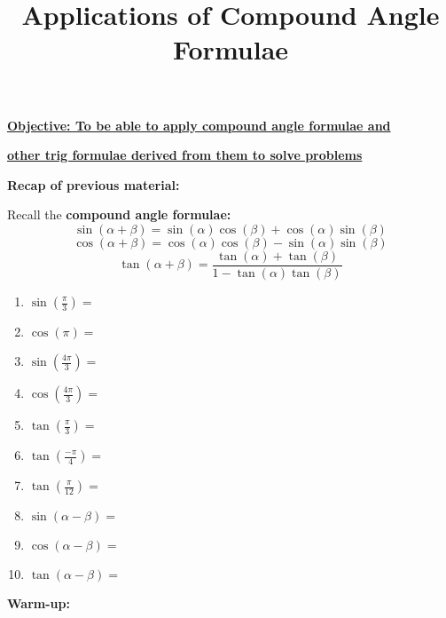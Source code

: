\documentclass{article}
\begin{document}
\title{Applications of Compound Angle Formulae}
\date{}

\maketitle
\thispagestyle{empty}

\Large

\textbf{\underline{Objective: To be able to apply compound angle formulae and}}

\textbf{\underline{other trig formulae derived from them to solve problems}}




\vspace{5mm}


\textbf{Recap of previous material:}

\vspace{5mm}

Recall the \textbf{compound angle formulae:}
\[\sin(\alpha+\beta)=\sin(\alpha)\cos(\beta)+\cos(\alpha)\sin(\beta)\]
\[\cos(\alpha+\beta)=\cos(\alpha)\cos(\beta)-\sin(\alpha)\sin(\beta)\]
\[\tan(\alpha+\beta)=\frac{\tan(\alpha)+\tan(\beta)}{1-\tan(\alpha)\tan(\beta)}\]


\begin{enumerate}
\item $\sin\left(\frac{\pi}{3}\right)=$
\item $\cos(\pi)=$
\item $\sin\left(\frac{4\pi}{3}\right)=$
\item $\cos\left(\frac{4\pi}{3}\right)=$
\item $\tan\left(\frac{\pi}{3}\right)=$
\item $\tan\left(\frac{-\pi}{4}\right)=$
\item $\tan\left(\frac{\pi}{12}\right)=$
\item $\sin(\alpha-\beta)=$
\item $\cos(\alpha-\beta)=$
\item $\tan(\alpha-\beta)=$
\end{enumerate}


\clearpage


\textbf{Warm-up:}

\vspace{5mm}
\end{document}

